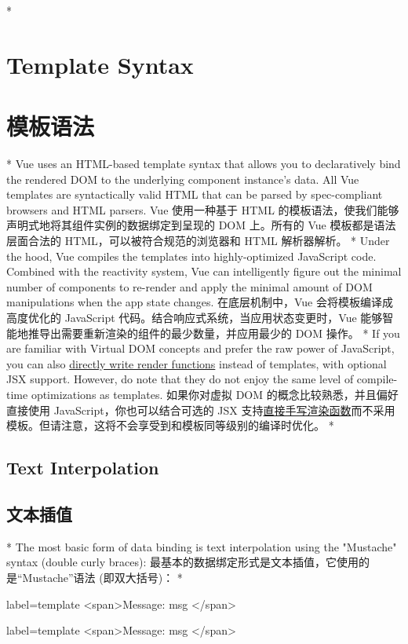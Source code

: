 \begin{paracol}{2}
\switchcolumn[0]*%
\section{Template Syntax}
\switchcolumn
\section{模板语法}
\switchcolumn[0]*%
Vue uses an HTML-based template syntax that allows you to declaratively
bind the rendered DOM to the underlying component instance's data. All
Vue templates are syntactically valid HTML that can be parsed by
spec-compliant browsers and HTML parsers.
\switchcolumn
Vue 使用一种基于 HTML
的模板语法，使我们能够声明式地将其组件实例的数据绑定到呈现的 DOM
上。所有的 Vue 模板都是语法层面合法的 HTML，可以被符合规范的浏览器和
HTML 解析器解析。
\switchcolumn[0]*%
Under the hood, Vue compiles the templates into highly-optimized
JavaScript code. Combined with the reactivity system, Vue can
intelligently figure out the minimal number of components to re-render
and apply the minimal amount of DOM manipulations when the app state
changes.
\switchcolumn
在底层机制中，Vue 会将模板编译成高度优化的 JavaScript
代码。结合响应式系统，当应用状态变更时，Vue
能够智能地推导出需要重新渲染的组件的最少数量，并应用最少的 DOM 操作。
\switchcolumn[0]*%
If you are familiar with Virtual DOM concepts and prefer the raw power
of JavaScript, you can also
\href{https://vuejs.org/guide/extras/render-function.html}{directly
write render functions} instead of templates, with optional JSX support.
However, do note that they do not enjoy the same level of compile-time
optimizations as templates.
\switchcolumn
如果你对虚拟 DOM 的概念比较熟悉，并且偏好直接使用
JavaScript，你也可以结合可选的 JSX
支持\href{https://cn.vuejs.org/guide/extras/render-function.html}{直接手写渲染函数}而不采用模板。但请注意，这将不会享受到和模板同等级别的编译时优化。
\switchcolumn[0]*%
\subsection{Text Interpolation}
\switchcolumn
\subsection{文本插值}
\switchcolumn[0]*%
The most basic form of data binding is text interpolation using the
"Mustache" syntax (double curly braces):
\switchcolumn
最基本的数据绑定形式是文本插值，它使用的是``Mustache''语法
(即双大括号)：
\switchcolumn[0]*%
\begin{codeHtml*}{label=template}
<span>Message: {{ msg }}</span>
\end{codeHtml*}  
\switchcolumn
\begin{codeHtml*}{label=template}
<span>Message: {{ msg }}</span>
\end{codeHtml*}  


\end{paracol}
